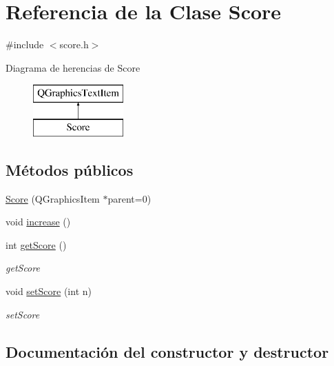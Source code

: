 \hypertarget{class_score}{}\section{Referencia de la Clase Score}
\label{class_score}


{\ttfamily \#include $<$score.\+h$>$}

Diagrama de herencias de Score\begin{figure}[H]
\begin{center}
\leavevmode
\includegraphics[height=2.000000cm]{class_score}
\end{center}
\end{figure}
\subsection*{Métodos públicos}
\begin{DoxyCompactItemize}
\item 
\hyperlink{class_score_af7c3392a27388a66b8a94448a995634d}{Score} (Q\+Graphics\+Item $\ast$parent=0)
\item 
void \hyperlink{class_score_ab5dbfab6935903c075509546878cfbda}{increase} ()
\item 
int \hyperlink{class_score_a8627c93270c188a3fd28a25b1d07a9e7}{get\+Score} ()
\begin{DoxyCompactList}\small\item\em get\+Score \end{DoxyCompactList}\item 
void \hyperlink{class_score_a4ed969e7c03d43036b1800b9ac9d224f}{set\+Score} (int n)
\begin{DoxyCompactList}\small\item\em set\+Score \end{DoxyCompactList}\end{DoxyCompactItemize}


\subsection{Documentación del constructor y destructor}
\hypertarget{class_score_af7c3392a27388a66b8a94448a995634d}{}\label{class_score_af7c3392a27388a66b8a94448a995634d} 
